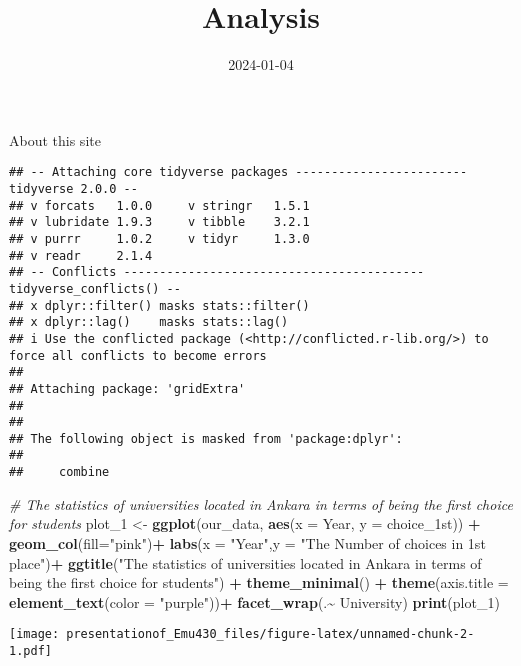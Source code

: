 \documentclass[
]{article}
\title{Analysis}
\author{}
\date{\vspace{-2.5em}2024-01-04}
\newenvironment{Shaded}{\begin{snugshade}}{\end{snugshade}}
\newcommand{\AttributeTok}[1]{\textcolor[rgb]{0.13,0.29,0.53}{#1}}
\newcommand{\CommentTok}[1]{\textcolor[rgb]{0.56,0.35,0.01}{\textit{#1}}}
\newcommand{\FunctionTok}[1]{\textcolor[rgb]{0.13,0.29,0.53}{\textbf{#1}}}
\newcommand{\NormalTok}[1]{#1}
\newcommand{\OtherTok}[1]{\textcolor[rgb]{0.56,0.35,0.01}{#1}}
\newcommand{\SpecialCharTok}[1]{\textcolor[rgb]{0.81,0.36,0.00}{\textbf{#1}}}
\newcommand{\StringTok}[1]{\textcolor[rgb]{0.31,0.60,0.02}{#1}}
\begin{document}
\maketitle

About this site

\begin{verbatim}
## -- Attaching core tidyverse packages ------------------------ tidyverse 2.0.0 --
## v forcats   1.0.0     v stringr   1.5.1
## v lubridate 1.9.3     v tibble    3.2.1
## v purrr     1.0.2     v tidyr     1.3.0
## v readr     2.1.4     
## -- Conflicts ------------------------------------------ tidyverse_conflicts() --
## x dplyr::filter() masks stats::filter()
## x dplyr::lag()    masks stats::lag()
## i Use the conflicted package (<http://conflicted.r-lib.org/>) to force all conflicts to become errors
## 
## Attaching package: 'gridExtra'
## 
## 
## The following object is masked from 'package:dplyr':
## 
##     combine
\end{verbatim}

\begin{Shaded}
\begin{Highlighting}[]
\CommentTok{\# The statistics of universities located in Ankara in terms of being the first choice for  students}
\NormalTok{plot\_1 }\OtherTok{\textless{}{-}} \FunctionTok{ggplot}\NormalTok{(our\_data, }\FunctionTok{aes}\NormalTok{(}\AttributeTok{x =}\NormalTok{ Year, }\AttributeTok{y =}\NormalTok{ choice\_1st)) }\SpecialCharTok{+}
  \FunctionTok{geom\_col}\NormalTok{(}\AttributeTok{fill=}\StringTok{"pink"}\NormalTok{)}\SpecialCharTok{+}
  \FunctionTok{labs}\NormalTok{(}\AttributeTok{x =} \StringTok{"Year"}\NormalTok{,}\AttributeTok{y =} \StringTok{"The Number of choices in 1st place"}\NormalTok{)}\SpecialCharTok{+}
  \FunctionTok{ggtitle}\NormalTok{(}\StringTok{"The statistics of universities located in Ankara in terms of being the first choice for students"}\NormalTok{) }\SpecialCharTok{+}
  \FunctionTok{theme\_minimal}\NormalTok{() }\SpecialCharTok{+}
  \FunctionTok{theme}\NormalTok{(}\AttributeTok{axis.title =} \FunctionTok{element\_text}\NormalTok{(}\AttributeTok{color =} \StringTok{"purple"}\NormalTok{))}\SpecialCharTok{+}
  \FunctionTok{facet\_wrap}\NormalTok{(.}\SpecialCharTok{\textasciitilde{}}\NormalTok{ University)}
\FunctionTok{print}\NormalTok{(plot\_1)}
\end{Highlighting}
\end{Shaded}

\texttt{[image: presentationof\_Emu430\_files/figure-latex/unnamed-chunk-2-1.pdf]}
\end{document}
